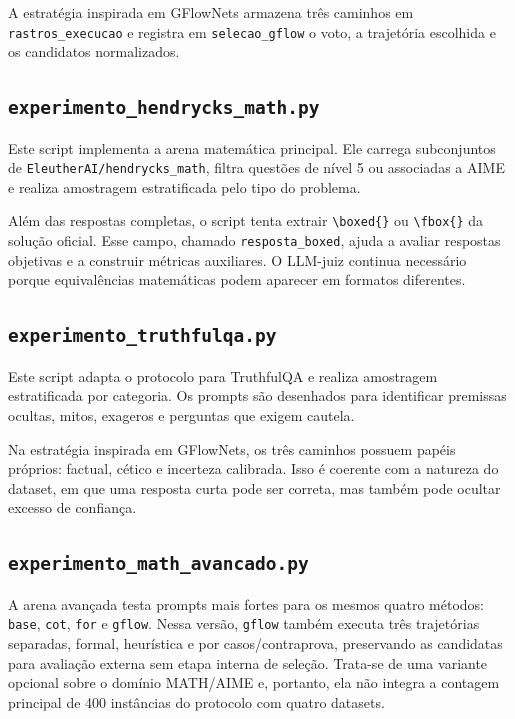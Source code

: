 \documentclass[12pt]{article}
\begin{document}
A estratégia inspirada em GFlowNets armazena três caminhos em \texttt{rastros\_execucao} e registra em \texttt{selecao\_gflow} o voto, a trajetória escolhida e os candidatos normalizados.

\subsection{\texttt{experimento\_hendrycks\_math.py}}

Este script implementa a arena matemática principal. Ele carrega subconjuntos de \texttt{EleutherAI/hendrycks\_math}, filtra questões de nível 5 ou associadas a AIME e realiza amostragem estratificada pelo tipo do problema.

Além das respostas completas, o script tenta extrair \texttt{\textbackslash boxed\{\}} ou \texttt{\textbackslash fbox\{\}} da solução oficial. Esse campo, chamado \texttt{resposta\_boxed}, ajuda a avaliar respostas objetivas e a construir métricas auxiliares. O LLM-juiz continua necessário porque equivalências matemáticas podem aparecer em formatos diferentes.

\subsection{\texttt{experimento\_truthfulqa.py}}

Este script adapta o protocolo para TruthfulQA e realiza amostragem estratificada por categoria. Os prompts são desenhados para identificar premissas ocultas, mitos, exageros e perguntas que exigem cautela.

Na estratégia inspirada em GFlowNets, os três caminhos possuem papéis próprios: factual, cético e incerteza calibrada. Isso é coerente com a natureza do dataset, em que uma resposta curta pode ser correta, mas também pode ocultar excesso de confiança.

\subsection{\texttt{experimento\_math\_avancado.py}}

A arena avançada testa prompts mais fortes para os mesmos quatro métodos: \texttt{base}, \texttt{cot}, \texttt{for} e \texttt{gflow}. Nessa versão, \texttt{gflow} também executa três trajetórias separadas, formal, heurística e por casos/contraprova, preservando as candidatas para avaliação externa sem etapa interna de seleção. Trata-se de uma variante opcional sobre o domínio MATH/AIME e, portanto, ela não integra a contagem principal de 400 instâncias do protocolo com quatro datasets.
\end{document}
